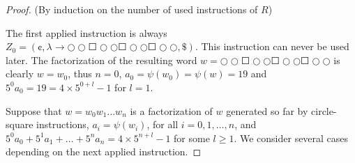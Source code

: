\begin{proof}
(By induction on the number of used instructions of $R$)

The first applied instruction is always
$Z_0 = (\cent, \lambda \to \Circle \Circle \Square \Circle \Circle \Square \Circle \Circle \Square \Circle \Circle, \$)$.
This instruction can never be used later.
The factorization of the resulting word $w = \Circle \Circle \Square \Circle \Circle \Square \Circle \Circle \Square \Circle \Circle$
is clearly $w = w_0$, thus $n = 0$, $a_0 = \psi(w_0) = \psi(w) = 19$ and $5^0 a_0 = 19 = 4 \times 5^{0+l} - 1$ for $l = 1$.

Suppose that $w = w_0 w_1 \ldots w_n$ is a factorization of $w$ generated so far by
circle-square instructions, $a_i = \psi(w_i)$, for all $i = 0, 1, \ldots, n$,
and $5^0 a_0 + 5^1 a_1 + \ldots + 5^n a_n = 4 \times 5^{n+l} - 1$ for some $l \ge 1$.
We consider several cases depending on the next applied instruction.


\end{proof}
